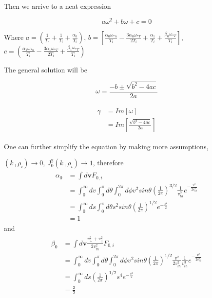     Then we arrive to a neat expression
    
    \begin{equation}
        a\omega^2+b\omega+c=0
    \end{equation}
    
    Where $a=\left(
    \frac{1}{T_e}+
    \frac{1}{T_i}+
    \frac{\alpha_0}{ T_i}
    \right)$,
    $b=\left[
    \frac{\alpha_0\omega_{*n}}{ T_i}-
    \frac{3\alpha_0\omega_{*T}}{2 T_i}+
    \frac{\alpha_1}{ T_i}+
    \frac{\beta_0\omega_{*T}}{T_i}
    \right]
    $,
    $c=
    \left(
    \frac{\alpha_1\omega_{*n}}{ T_i}-
    \frac{3\alpha_1\omega_{*T}}{2 T_i}+
    \frac{\beta_1\omega_{*T}}{T_i}
    \right)
    $
    
    The general solution will be 
    
    \begin{equation}
     \omega=\frac{-b \pm \sqrt{b^{2}-4 a c}}{2 a}
    \end{equation}
    
    \begin{eqnarray}
        \begin{aligned}
        \gamma{}&=Im[\omega]\\
        &=Im[\frac{\sqrt{b^2-4ac}}{2a}]
        \end{aligned}
    \end{eqnarray}
    
        
    
    One can further simplify the equation by making more assumptions,
    
    $(k_\perp\rho_i)\rightarrow 0$, $J_0^2(k_\perp\rho_i)\rightarrow 1$, therefore
    \begin{eqnarray}
        \begin{aligned} 
        \alpha_0{}&=\int d\textbf{v}     F_{0,i}\\
        &=\int^\infty_0 dv \int ^\pi_0 d\theta \int ^{2\pi}_0 d\phi v^2sin\theta (\frac{1}{2\pi})^{3/2}\frac{1}{v_{th}^3}e^{-\frac{v^2}{2v_{th}^2}}\\
        &=\int^\infty_0 ds \int ^\pi_0 d\theta s^2sin\theta (\frac{1}{2\pi})^{1/2}e^{-\frac{s^2}{2}}\\
        &=1
        \end{aligned}
    \end{eqnarray}
    and
    \begin{eqnarray}
        \begin{aligned} 
        \beta_0{}&=\int d\textbf{v} \frac{v^2_{\perp}+v_{||}^2}{2v_{th}^2} F_{0,i}\\
        &=\int^\infty_0 dv \int ^\pi_0 d\theta \int ^{2\pi}_0 d\phi v^2sin\theta (\frac{1}{2\pi})^{1/2}\frac{v^2}{2v_{th}^2}\frac{1}{v_{th}^3}e^{-\frac{v^2}{2v_{th}^2}}\\
        &=\int^\infty_0 ds (\frac{1}{2\pi})^{1/2}s^4e^{-\frac{s^2}{2}}\\
        &=\frac{3}{2}
        \end{aligned}
    \end{eqnarray}
    

